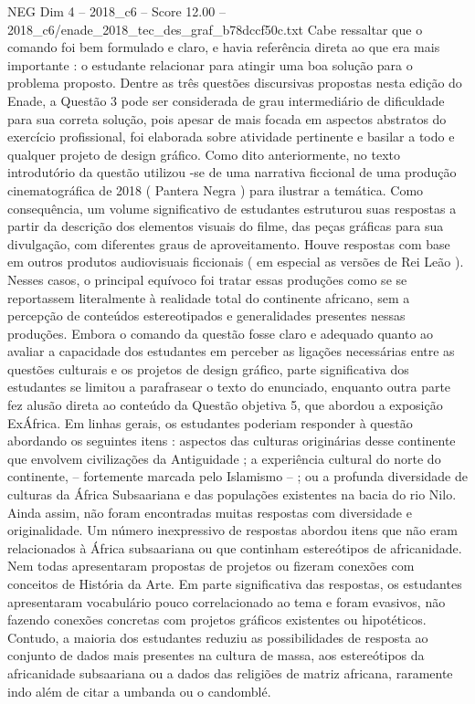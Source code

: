 \begin{textsample}{NEG Dim 4 – 2018\_c6 – Score 12.00 – 2018\_c6/enade\_2018\_tec\_des\_graf\_b78dccf50c.txt}
Cabe ressaltar que o comando foi bem formulado e claro, e havia referência direta ao que era mais importante : o estudante relacionar para atingir uma boa solução para o problema proposto.
Dentre as três questões discursivas propostas nesta edição do Enade, a Questão 3 pode ser considerada de grau intermediário de dificuldade para sua correta solução, pois apesar de mais focada em aspectos abstratos do exercício profissional, foi elaborada sobre atividade pertinente e basilar a todo e qualquer projeto de design gráfico.
Como dito anteriormente, no texto introdutório da questão utilizou -se de uma narrativa ficcional de uma produção cinematográfica de 2018 ( Pantera Negra ) para ilustrar a temática.
Como consequência, um volume significativo de estudantes estruturou suas respostas a partir da descrição dos elementos visuais do filme, das peças gráficas para sua divulgação, com diferentes graus de aproveitamento.
Houve respostas com base em outros produtos audiovisuais ficcionais ( em especial as versões de Rei Leão ).
Nesses casos, o principal equívoco foi tratar essas produções como se se reportassem literalmente à realidade total do continente africano, sem a percepção de conteúdos estereotipados e generalidades presentes nessas produções.
Embora o comando da questão fosse claro e adequado quanto ao avaliar a capacidade dos estudantes em perceber as ligações necessárias entre as questões culturais e os projetos de design gráfico, parte significativa dos estudantes se limitou a parafrasear o texto do enunciado, enquanto outra parte fez alusão direta ao conteúdo da Questão objetiva 5, que abordou a exposição ExÁfrica.
Em linhas gerais, os estudantes poderiam responder à questão abordando os seguintes itens : aspectos das culturas originárias desse continente que envolvem civilizações da Antiguidade ; a experiência cultural do norte do continente, – fortemente marcada pelo Islamismo – ; ou a profunda diversidade de culturas da África Subsaariana e das populações existentes na bacia do rio Nilo.
Ainda assim, não foram encontradas muitas respostas com diversidade e originalidade.
Um número inexpressivo de respostas abordou itens que não eram relacionados à África subsaariana ou que continham estereótipos de africanidade.
Nem todas apresentaram propostas de projetos ou fizeram conexões com conceitos de História da Arte.
Em parte significativa das respostas, os estudantes apresentaram vocabulário pouco correlacionado ao tema e foram evasivos, não fazendo conexões concretas com projetos gráficos existentes ou hipotéticos.
Contudo, a maioria dos estudantes reduziu as possibilidades de resposta ao conjunto de dados mais presentes na cultura de massa, aos estereótipos da africanidade subsaariana ou a dados das religiões de matriz africana, raramente indo além de citar a umbanda ou o candomblé.

\end{textsample}
